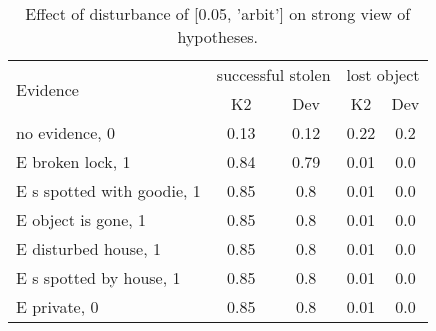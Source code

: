 \begin{table}\begin{tabular}{l|cc|cc}\toprule\multirow{2}{*}{Evidence} & \multicolumn{2}{c}{successful stolen}& \multicolumn{2}{c}{lost object}\\& {K2} & {Dev}& {K2} & {Dev}\\\midrule
no evidence, 0 & 0.13&0.12&0.22&0.2\\E broken lock, 1 & 0.84&0.79&0.01&0.0\\E s spotted with goodie, 1 & 0.85&0.8&0.01&0.0\\E object is gone, 1 & 0.85&0.8&0.01&0.0\\E disturbed house, 1 & 0.85&0.8&0.01&0.0\\E s spotted by house, 1 & 0.85&0.8&0.01&0.0\\E private, 0 & 0.85&0.8&0.01&0.0\\\bottomrule\end{tabular}\caption{Effect of disturbance of [0.05, 'arbit'] on strong view of hypotheses.}\end{table}